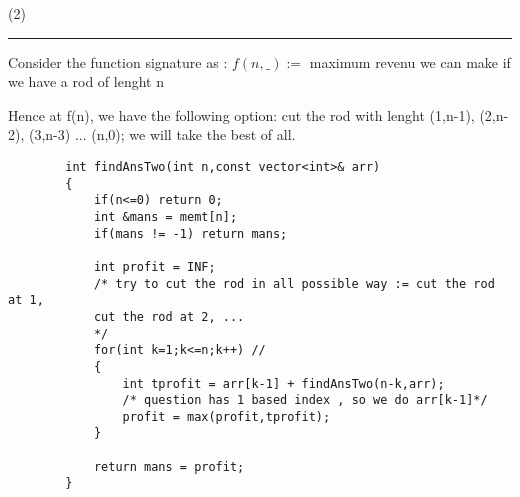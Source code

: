 \begin{solution}
    (2)
    \vspace{3mm}
    \hrule
    
    \begin{intution}
        Consider the function signature as :
        $f(n,\_) :=$ maximum revenu we can make if we have a rod of lenght n
    \end{intution}

    Hence at f(n), we have the following option: 
    cut the rod with lenght (1,n-1), (2,n-2), (3,n-3) ... (n,0); we will take the best of all.

    \begin{verbatim}
        int findAnsTwo(int n,const vector<int>& arr)
        {
            if(n<=0) return 0;
            int &mans = memt[n];
            if(mans != -1) return mans;

            int profit = INF;
            /* try to cut the rod in all possible way := cut the rod at 1,
            cut the rod at 2, ...
            */
            for(int k=1;k<=n;k++) //
            {
                int tprofit = arr[k-1] + findAnsTwo(n-k,arr); 
                /* question has 1 based index , so we do arr[k-1]*/
                profit = max(profit,tprofit);
            }

            return mans = profit;
        }
    \end{verbatim}
    
\end{solution}

